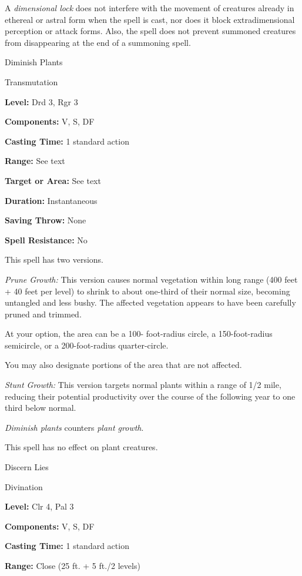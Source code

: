 \documentclass{article}
\begin{document}
A \textit{dimensional lock }does not interfere with the movement of creatures already 
in ethereal or astral form when the spell is cast, nor does it block extradimensional 
perception or attack forms. Also, the spell does not prevent summoned creatures 
from disappearing at the end of a summoning spell.

\vspace{12pt}
Diminish Plants

Transmutation

\textbf{Level:} Drd 3, Rgr 3

\textbf{Components:} V, S, DF

\textbf{Casting Time:} 1 standard action

\textbf{Range:} See text

\textbf{Target or Area:} See text

\textbf{Duration:} Instantaneous

\textbf{Saving Throw:} None

\textbf{Spell Resistance:} No

This spell has two versions.

\textit{Prune Growth: }This version causes normal vegetation within long range 
(400 feet + 40 feet per level) to shrink to about one-third of their normal size, 
becoming untangled and less bushy. The affected vegetation appears to have been 
carefully pruned and trimmed.

At your option, the area can be a 100- foot-radius circle, a 150-foot-radius semicircle, 
or a 200-foot-radius quarter-circle.

You may also designate portions of the area that are not affected.

\textit{Stunt Growth: }This version targets normal plants within a range of 1/2 
mile, reducing their potential productivity over the course of the following year 
to one third below normal.

\textit{Diminish plants }counters \textit{plant growth}.

This spell has no effect on plant creatures.

\vspace{12pt}
Discern Lies

Divination

\textbf{Level:} Clr 4, Pal 3

\textbf{Components:} V, S, DF

\textbf{Casting Time:} 1 standard action

\textbf{Range:} Close (25 ft. + 5 ft./2 levels)
\end{document}
